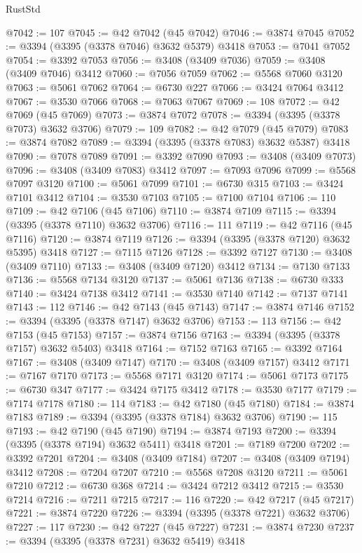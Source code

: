 \begin{lexlean}{RustStd}
\begin{coremodule}
@7042 := 107
@7045 := @42 @7042 (@45 @7042)
@7046 := @3874 @7045
@7052 := @3394 (@3395 (@3378 @7046) @3632 @5379) @3418
@7053 := @7041 @7052
@7054 := @3392 @7053
@7056 := @3408 (@3409 @7036)
@7059 := @3408 (@3409 @7046) @3412
@7060 := @7056 @7059
@7062 := @5568 @7060 @3120
@7063 := @5061 @7062
@7064 := @6730 @227
@7066 := @3424 @7064 @3412
@7067 := @3530 @7066
@7068 := @7063 @7067
@7069 := 108
@7072 := @42 @7069 (@45 @7069)
@7073 := @3874 @7072
@7078 := @3394 (@3395 (@3378 @7073) @3632 @3706)
@7079 := 109
@7082 := @42 @7079 (@45 @7079)
@7083 := @3874 @7082
@7089 := @3394 (@3395 (@3378 @7083) @3632 @5387) @3418
@7090 := @7078 @7089
@7091 := @3392 @7090
@7093 := @3408 (@3409 @7073)
@7096 := @3408 (@3409 @7083) @3412
@7097 := @7093 @7096
@7099 := @5568 @7097 @3120
@7100 := @5061 @7099
@7101 := @6730 @315
@7103 := @3424 @7101 @3412
@7104 := @3530 @7103
@7105 := @7100 @7104
@7106 := 110
@7109 := @42 @7106 (@45 @7106)
@7110 := @3874 @7109
@7115 := @3394 (@3395 (@3378 @7110) @3632 @3706)
@7116 := 111
@7119 := @42 @7116 (@45 @7116)
@7120 := @3874 @7119
@7126 := @3394 (@3395 (@3378 @7120) @3632 @5395) @3418
@7127 := @7115 @7126
@7128 := @3392 @7127
@7130 := @3408 (@3409 @7110)
@7133 := @3408 (@3409 @7120) @3412
@7134 := @7130 @7133
@7136 := @5568 @7134 @3120
@7137 := @5061 @7136
@7138 := @6730 @333
@7140 := @3424 @7138 @3412
@7141 := @3530 @7140
@7142 := @7137 @7141
@7143 := 112
@7146 := @42 @7143 (@45 @7143)
@7147 := @3874 @7146
@7152 := @3394 (@3395 (@3378 @7147) @3632 @3706)
@7153 := 113
@7156 := @42 @7153 (@45 @7153)
@7157 := @3874 @7156
@7163 := @3394 (@3395 (@3378 @7157) @3632 @5403) @3418
@7164 := @7152 @7163
@7165 := @3392 @7164
@7167 := @3408 (@3409 @7147)
@7170 := @3408 (@3409 @7157) @3412
@7171 := @7167 @7170
@7173 := @5568 @7171 @3120
@7174 := @5061 @7173
@7175 := @6730 @347
@7177 := @3424 @7175 @3412
@7178 := @3530 @7177
@7179 := @7174 @7178
@7180 := 114
@7183 := @42 @7180 (@45 @7180)
@7184 := @3874 @7183
@7189 := @3394 (@3395 (@3378 @7184) @3632 @3706)
@7190 := 115
@7193 := @42 @7190 (@45 @7190)
@7194 := @3874 @7193
@7200 := @3394 (@3395 (@3378 @7194) @3632 @5411) @3418
@7201 := @7189 @7200
@7202 := @3392 @7201
@7204 := @3408 (@3409 @7184)
@7207 := @3408 (@3409 @7194) @3412
@7208 := @7204 @7207
@7210 := @5568 @7208 @3120
@7211 := @5061 @7210
@7212 := @6730 @368
@7214 := @3424 @7212 @3412
@7215 := @3530 @7214
@7216 := @7211 @7215
@7217 := 116
@7220 := @42 @7217 (@45 @7217)
@7221 := @3874 @7220
@7226 := @3394 (@3395 (@3378 @7221) @3632 @3706)
@7227 := 117
@7230 := @42 @7227 (@45 @7227)
@7231 := @3874 @7230
@7237 := @3394 (@3395 (@3378 @7231) @3632 @5419) @3418

\end{coremodule}
\end{lexlean}
